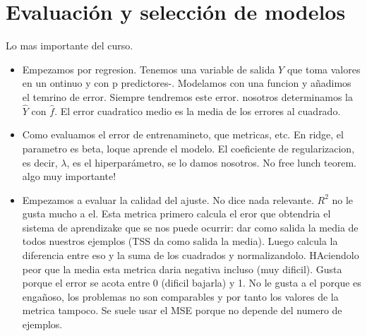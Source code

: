 \chapter{Evaluación y selección de modelos}\label{Chapter4} 

Lo mas importante del curso. 

\begin{itemize}
\item Empezamos por regresion. Tenemos una variable de salida $Y$ que toma valores en un ontinuo y con p predictores-. Modelamos con una funcion y añadimos el temrino de error. Siempre tendremos este error. nosotros determinamos la $\hat{Y}$ con $\hat{f}$. El error cuadratico medio es la media de los errores al cuadrado.
\item Como evaluamos el error de entrenamineto, que metricas, etc. En ridge, el parametro es beta, loque aprende el modelo. El coeficiente de regularizacion, es decir, $\lambda$, es el hiperparámetro, se lo damos nosotros. No free lunch teorem. algo muy importante!
\item Empezamos a evaluar la calidad del ajuste. No dice nada relevante. $R^2$ no le gusta mucho a el. Esta metrica primero calcula el eror que obtendria el sistema de aprendizake que se nos puede ocurrir: dar como salida la media de todos nuestros ejemplos (TSS da como salida la media). Luego calcula la diferencia entre eso y la suma de los cuadrados y normalizandolo. HAciendolo peor que la media esta metrica daria negativa incluso (muy dificil). Gusta porque el error se acota entre 0 (dificil bajarla) y 1. No le gusta a el porque es engañoso, los problemas no son comparables y por tanto los valores de la metrica tampoco. Se suele usar el MSE porque no depende del numero de ejemplos. 


\end{itemize}
